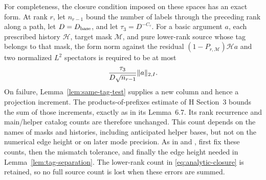For completeness, the closure condition imposed on these spaces
has an exact form.  At rank \(r\), let \(n_{r-1}\) bound the
number of labels through the preceding rank along a path, let
\(D=D_{\rm base}\), and let \(\tau_3=D^{-C_\tau}\).  For a
basic argument \(a\), each prescribed history \(\mathcal H\),
target mask \(\mathcal M\), and pure lower-rank source whose
tag belongs to that mask, the form norm against the residual
\((1-P_{r,\mathcal M})\mathcal Ha\) and two normalized
\(L^2\) spectators is required to be at most
\begin{equation}
 \frac{\tau_3}{D\sqrt{n_{r-1}}}\lVert a\rVert_{2,I}.
 \label{eq:analytic-closure}
\end{equation}
On failure, Lemma~\ref{lem:same-tag-test} supplies a new column
and hence a projection increment.  The products-of-prefixes
estimate of H Section~3 bounds the sum of those increments,
exactly as in its Lemma~6.7.  Its rank recurrence and main/helper
catalog counts are therefore unchanged.  This count depends on the
names of masks and histories, including anticipated helper bases,
but not on the numerical edge height or on later mode precision.
As in \cite[Section~6.4]{H} and \cite[Section~6.1]{V}, first fix
these counts, then the mismatch tolerance, and finally the edge
height needed in Lemma~\ref{lem:tag-separation}.
The lower-rank count in
\eqref{eq:analytic-closure} is retained, so no full source count
is lost when these errors are summed.

